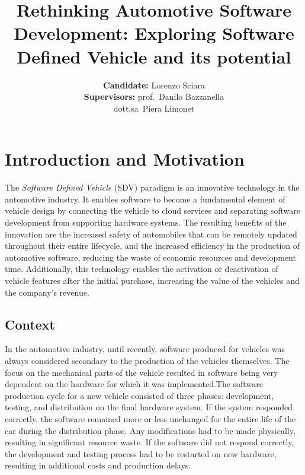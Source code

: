 \documentclass[10pt,a4paper,roman, twocolumn]{article}
\title{\LARGE\textbf{Rethinking Automotive Software Development: Exploring Software Defined Vehicle and its potential}}
\author{
	\textbf{Candidate:} Lorenzo Sciara\\
	\textbf{Supervisors:} prof.~Danilo Bazzanella \\ dott.sa~Piera Limonet
}
\date{}
\begin{document}
\setlength{\belowdisplayskip}{0pt} \setlength{\belowdisplayshortskip}{0pt}
\setlength{\abovedisplayskip}{-0.5\baselineskip} \setlength{\abovedisplayshortskip}{-0.5\baselineskip}

	
\maketitle
		
\section{Introduction and Motivation}
The \textit{Software Defined Vehicle} (SDV) paradigm is an innovative technology in the automotive industry. It enables software to become a fundamental element of vehicle design by connecting the vehicle to cloud services and separating software development from supporting hardware systems. The resulting benefits of the innovation are the increased safety of automobiles that can be remotely updated throughout their entire lifecycle, and the increased efficiency in the production of automotive software, reducing the waste of economic resources and development time. Additionally, this technology enables the activation or deactivation of vehicle features after the initial purchase, increasing the value of the vehicles and the company's revenue.

\subsection{Context}
In the automotive industry, until recently, software produced for vehicles was always considered secondary to the production of the vehicles themselves. The focus on the mechanical parts of the vehicle resulted in software being very dependent on the hardware for which it was implemented.The software production cycle for a new vehicle consisted of three phases: development, testing, and distribution on the final hardware system. If the system responded correctly, the software remained more or less unchanged for the entire life of the car during the distribution phase. Any modifications had to be made physically, resulting in significant resource waste. If the software did not respond correctly, the development and testing process had to be restarted on new hardware, resulting in additional costs and production delays.
\end{document}
